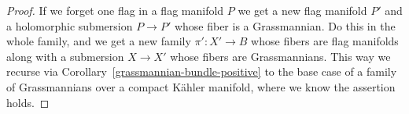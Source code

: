 \documentclass[10pt,a4paper]{article}
\newtheorem*{proof}{Proof}
\begin{document}
\begin{proof}
If we forget one flag in a flag manifold $P$ we get a new flag manifold $P'$ and
a holomorphic submersion $P \to P'$ whose fiber is a Grassmannian. Do this in
the whole family, and we get a new family $\pi' : X' \to B$ whose fibers are
flag manifolds along with a submersion $X \to X'$ whose fibers are
Grassmannians. This way we recurse via Corollary~\ref{grassmannian-bundle-positive}
to the base case of a family of Grassmannians over a compact K\"ahler manifold,
where we know the assertion holds.
\end{proof}




\end{document}
